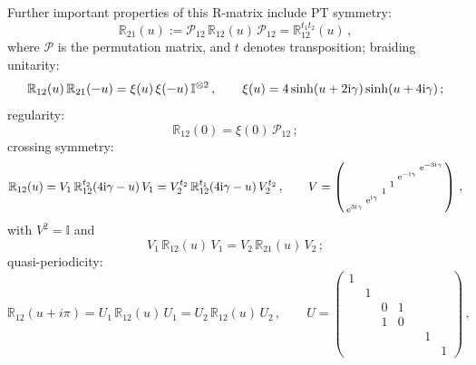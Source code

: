 \documentclass[12pt]{article}
\numberwithin{equation}{section}
\newcommand{\ri}{{\rm i}}
\newcommand{\re}{{\rm e}}
\newcommand{\id}{\mathbb{I}}
\begin{document}
Further important properties of this R-matrix include PT symmetry:
\begin{equation}
    \mathbb{R}_{21}(u):= \mathcal{P}_{12}\, \mathbb{R}_{12}(u)\, \mathcal{P}_{12} = \mathbb{R}_{12}^{t_1 t_2}(u)\,, 
    \label{PT}
\end{equation}
where $\mathcal{P}$ is the permutation matrix, and $t$ denotes transposition; braiding unitarity:
\begin{equation}
    \mathbb{R}_{12}(u)\, \mathbb{R}_{21}(-u)=\xi(u)\, \xi(-u)\, \id^{\otimes 2}\,, \qquad \xi(u)=4\sinh(u+2\ri \gamma)\sinh(u+4\ri \gamma)\,;
    \label{unitarityR}
 \end{equation}   
regularity:
\begin{equation}    
   \mathbb{R}_{12}(0)=\xi(0)\, \mathcal{P}_{12}\,; \label{Reg}
\end{equation}
crossing symmetry:
\begin{equation}
\mathbb{R}_{12}(u) = V_1\, \mathbb{R}_{12}^{t_2}(4\ri \gamma-u)\, V_1 
= V_2^{t_2}\, \mathbb{R}_{12}^{t_1}(4\ri \gamma-u)\, V_2^{t_2}\,, \qquad 
V = \left(\begin{smallmatrix}
     &  &  &   &  &  \re^{-3\ri \gamma}\\
     &  &  &   &  \re^{-\ri \gamma} & \\
     &  &  &   1 &   &   \\
     &  &  1 &  &    & \\
     &  \re^{\ri \gamma} &  &  &  &   \\
     \re^{3\ri \gamma} &  &  &  &  &  
    \end{smallmatrix}\right) \,,
    \label{crossingR}
\end{equation}
with $V^2 = \id$ and 
\begin{equation}
 V_1\, \mathbb{R}_{12}(u)\, V_1= V_2\, \mathbb{R}_{21}(u)\, V_2 \,;
 \label{Vprop}
\end{equation}
quasi-periodicity:
\begin{equation}
    \mathbb{R}_{12}(u+i\pi) = U_1\, \mathbb{R}_{12}(u)\, U_1 = U_2\, \mathbb{R}_{12}(u)\, U_2\,, \qquad U = \left(\begin{smallmatrix}
    1 & & & & &\\
    & 1 & & & &\\
    & & 0 & 1 & &\\
    & & 1 & 0 & &\\
    & & & & & 1 & \\
    & & & & & & 1
    \end{smallmatrix}\right) \,,
\label{quasiperiodicity}
\end{equation}
\end{document}
